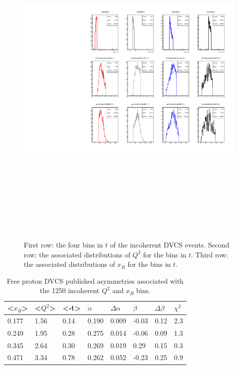 \begin{figure}[h!]
   \centering
   \includegraphics[height=17.0cm]{4D-incoh-bin/4D-t_InCoh_bins.pdf}
   \caption{ First row: the four bins in $t$ of the incoherent DVCS events.  
   Second row: the associated distributions of $Q^2$ for the bins in $t$.  
   Third row: the associated distributions of $x_B$ for the bins in $t$.}
\label{fig:incoh_xB-bins-freep}
\end{figure}




\begin {table}[!h]
\begin{center}
\begin{tabular}{|l|l|l|l|l|l|l|l|}
\hline
<$x_{B}$> & <$Q^2$> & <-t> & $\alpha$ & $\Delta \alpha$ &  $\beta$ & $\Delta 
   \beta$ & $\chi^{2}$\\
\hline
0.177 & 1.56 & 0.14 & 0.190 & 0.009 & -0.03 & 0.12  & 2.3\\
\hline
0.249 & 1.95 & 0.28 & 0.275 & 0.014 & -0.06 & 0.09  & 1.3\\
\hline
0.345 & 2.64 & 0.30 & 0.269 & 0.019 & 0.29 & 0.15  & 0.3\\
\hline
0.471 & 3.34 & 0.78 & 0.262 & 0.052 & -0.23 & 0.25  & 0.9\\
\hline
\end{tabular}
   \caption{Free proton DVCS published asymmetries associated with the 1250 
   incoherent $Q^{2}$ and $x_{B}$ bins.}
\label{Table:freeproton-x_Q2_bins}
\end{center}
\end{table}


